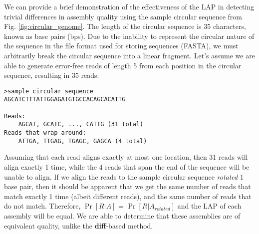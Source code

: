 


We can provide a brief demonstration of the effectiveness of the LAP in detecting trivial differences in assembly quality using the sample circular sequence from Fig. \ref{fig:circular_genome}.
The length of the circular sequence is 35 characters, known as base pairs (bps).
Due to the inability to represent the circular nature of the sequence in the file format used for storing sequences (FASTA), we must arbitrarily break the circular sequence into a linear fragment.
Let's assume we are able to generate error-free reads of length 5 from each position in the circular sequence, resulting in 35 reads:
\begin{verbatim}>sample circular sequence
AGCATCTTTATTGGAGATGTGCCACAGCACATTG

Reads:
    AGCAT, GCATC, ..., CATTG (31 total)
Reads that wrap around:
    ATTGA, TTGAG, TGAGC, GAGCA (4 total)
\end{verbatim}


Assuming that each read aligns exactly at most one location, then 31 reads will align exactly 1 time, while the 4 reads that span the end of the sequence will be unable to align.
If we align the reads to the sample circular sequence \emph{rotated} 1 base pair, then it should be apparent that we get the same number of reads that match exactly 1 time (albeit different reads), and the same number of reads that do not match.
Therefore, $\Pr[R \vert A]$ = $\Pr[R \vert A_{rotated}]$ and the LAP of each assembly will be equal.
We are able to determine that these assemblies are of equivalent quality, unlike the \textbf{diff}-based method.


